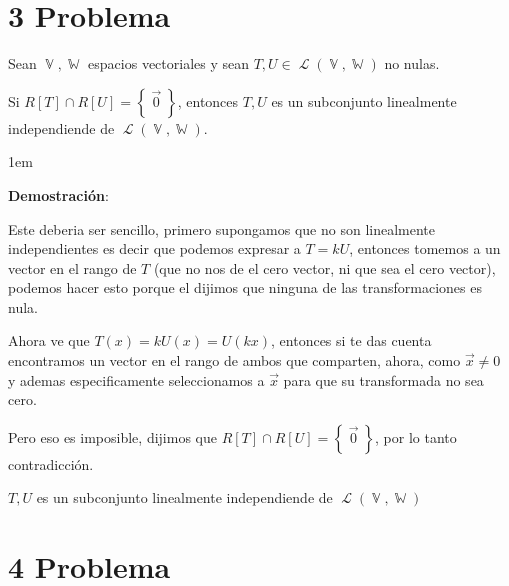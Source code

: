 \documentclass[12pt, fleqn]{article}                             %
\newenvironment{SmallIndentation}[1][0.75em]                    %
        {\begin{adjustwidth}{#1}{}\begin{footnotesize}}             %
        {\end{footnotesize}\end{adjustwidth}}                       %
\theoremstyle{break}                                            %
\DeclareMathOperator \VectorSet    {\mathbb{V}}                 %
\DeclareMathOperator \SubVectorSet {\mathbb{W}}                 %
\DeclareMathOperator \LinTrans {\mathcal{T}}                    %
\DeclareMathOperator \Laplace {\mathcal{L}}                     %
\newcommand{\Set}[1]    {\left\{ \; #1 \; \right\}}             %
\begin{document}
     


\clearpage
\section{3 Problema}


    Sean $\VectorSet, \SubVectorSet$ espacios vectoriales y sean 
    $T, U \in \Laplace(\VectorSet, \SubVectorSet)$ no nulas. 

    Si $R[T] \cap R[U] = \Set{\vec 0}$, entonces ${T, U}$ es un
    subconjunto linealmente independiende de $\Laplace(\VectorSet, \SubVectorSet)$. 

    \begin{SmallIndentation}[1em]
        \textbf{Demostración}:
        
        Este deberia ser sencillo, primero supongamos que no son linealmente independientes
        es decir que podemos expresar a $T = kU$, entonces tomemos a un vector en el rango 
        de $T$ (que no nos de el cero vector, ni que sea el cero vector), podemos hacer esto
        porque el dijimos que ninguna de las transformaciones es nula.

        Ahora ve que $T(x) = kU(x) = U(kx)$, entonces si te das cuenta encontramos un vector
        en el rango de ambos que comparten, ahora, como $\vec x \neq 0$ y ademas especificamente
        seleccionamos a $\vec x$ para que su transformada no sea cero.

        Pero eso es imposible, dijimos que $R[T] \cap R[U] = \Set{\vec 0}$, por lo tanto
        contradicción.

        ${T, U}$ es un subconjunto linealmente independiende de $\Laplace(\VectorSet, \SubVectorSet)$

    \end{SmallIndentation}
                            


\clearpage
\section{4 Problema}
\end{document}
